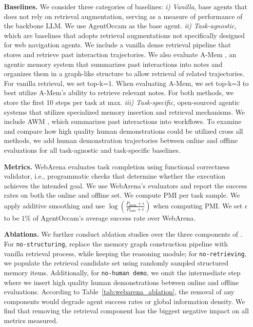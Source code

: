 \textbf{Baselines.}  We consider three categories of baselines: 
\textit{i) Vanilla}, base agents that does not rely on retrieval augmentation, serving as a measure of performance of the backbone LLM. We use AgentOccam \cite{yang2025agentoccamsimplestrongbaseline} as the base agent. \textit{ii) Task-agnostic}, which are baselines that adopts retrieval augmentations not specifically designed for web navigation agents. We include a vanilla dense retrieval pipeline that stores and retrieve past interaction trajectories. We also evaluate A-Mem \cite{xu2025amemagenticmemoryllm}, an agentic memory system that summarizes past interactions into notes and organizes them in a graph-like structure to allow retrieval of related trajectories. For vanilla retrieval, we set top-k=1. When evaluating A-Mem, we set top-k=3 to best utilize A-Mem's ability to retrieve relevant notes. For both methods, we store the first 10 steps per task at max. \textit{iii) Task-specific}, open-sourced agentic systems that utilizes specialized memory insertion and retrieval mechanisms. We include AWM \cite{wang2024agentworkflowmemory}, which summarizes past interactions into workflows. To examine and compare how high quality human demonstrations could be utilized cross all methods, we add human demonstration trajectories between online and offline evaluations for all task-agnostic and task-specific baselines.

\textbf{Metrics.} WebArena evaluates task completion using functional correctness validator, i.e., programmatic checks that determine whether the execution achieves the intended goal. We use WebArena's evaluators and report the success rates on both the online and offline set. We compute PMI per task sample. We apply additive smoothing and use
$\log\!\left(\frac{P_{\text{mem}}+\epsilon}{P_{\text{base}}+\epsilon}\right)$ when computing PMI. We set $\epsilon$ to be $1\%$ of AgentOccam's average success rate over WebArena.

\textbf{Ablations.} We further conduct ablation studies over the three components of \plugmem. For \texttt{no-structuring}, replace the memory graph construction pipeline with vanilla retrieval process, while keeping the reasoning module; for \texttt{no-retrieving}, we populate the retrieval candidate set using randomly sampled structured memory items. Additionally, for \texttt{no-human demo}, we omit the intermediate step where we insert high quality human demonstrations between online and offline evaluations. According to Table~\ref{tab:webarena_ablation}, the removal of any components would degrade agent success rates or global information density. We find that removing the retrieval component has the biggest negative impact on all metrics measured.


